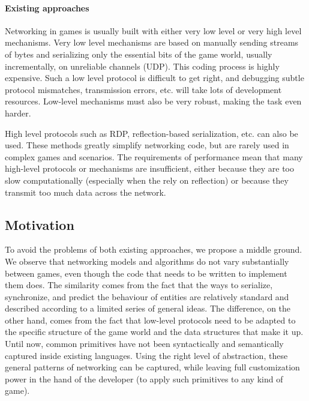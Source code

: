 \paragraph*{Existing approaches}
Networking in games is usually built with either very low level or very high level mechanisms. Very low level mechanisms are based on manually sending streams of bytes and serializing only the essential bits of the game world, usually incrementally, on unreliable channels (UDP). This coding process is highly expensive. Such a low level protocol is difficult to get right, and debugging subtle protocol mismatches, transmission errors, etc. will take lots of development resources. Low-level mechanisms must also be very robust, making the task even harder.

High level protocols such as RDP, reflection-based serialization, etc. can also be used. These methods greatly simplify  networking code, but are rarely used in complex games and scenarios. The requirements of performance mean that many high-level protocols or mechanisms are insufficient, either because they are too slow computationally (especially when the rely on reflection) or because they transmit too much data across the network.

\subsection*{Motivation}

To avoid the problems of both existing approaches, we propose a middle ground. We observe that networking models and algorithms do not vary substantially between games, even though the code that needs to be written to implement them does. The similarity comes from the fact that the ways to serialize, synchronize, and predict the behaviour of entities are relatively standard and described according to a limited series of general ideas. The difference, on the other hand, comes from the fact that low-level protocols need to be adapted to the specific structure of the game world and the data structures that make it up. Until now, common primitives have not been syntactically and semantically captured inside existing languages. Using the right level of abstraction, these general patterns of networking can be captured, while leaving full customization power in the hand of the developer (to apply such primitives to any kind of game).

